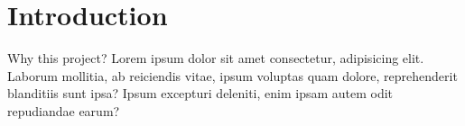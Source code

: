 \section{Introduction}

Why this project? Lorem ipsum dolor sit amet consectetur, adipisicing elit.
Laborum mollitia, ab reiciendis vitae, ipsum voluptas quam dolore, reprehenderit
blanditiis sunt ipsa? Ipsum excepturi deleniti, enim ipsam autem odit
repudiandae earum?